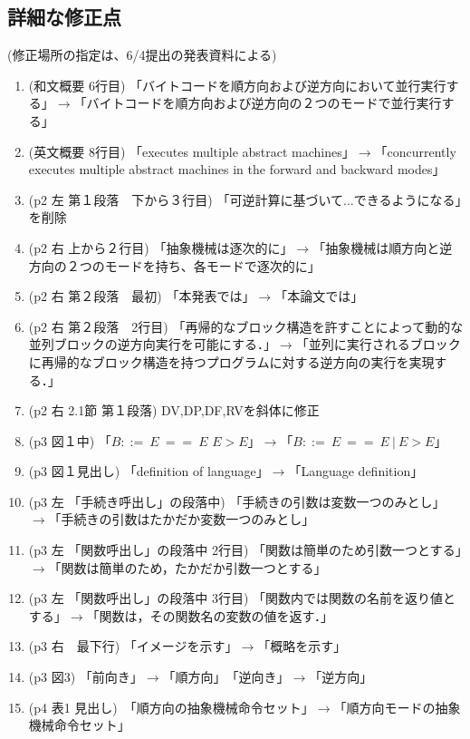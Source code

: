 \documentclass[a4j]{jarticle}
\begin{document}
\subsection*{詳細な修正点}

(修正場所の指定は、6/4提出の発表資料による)

\begin{enumerate}
\item (和文概要 6行目) 「バイトコードを順方向および逆方向において並行実行する」$\rightarrow$「バイトコードを順方向および逆方向の２つのモードで並行実行する」
\item (英文概要 8行目) 「executes multiple abstract machines」$\rightarrow$「concurrently executes multiple abstract machines in the forward and backward modes」
\item (p2 左 第１段落　下から３行目) 「可逆計算に基づいて...できるようになる」を削除
\item (p2 右 上から２行目) 「抽象機械は逐次的に」$\rightarrow$「抽象機械は順方向と逆方向の２つのモードを持ち、各モードで逐次的に」
\item (p2 右 第２段落　最初) 「本発表では」$\rightarrow$「本論文では」
\item (p2 右 第２段落　2行目) 「再帰的なブロック構造を許すことによって動的な並列ブロックの逆方向実行を可能にする．」$\rightarrow$「並列に実行されるブロックに再帰的なブロック構造を持つプログラムに対する逆方向の実行を実現する．」
\item (p2 右 2.1節 第１段落) DV,DP,DF,RVを斜体に修正
\item (p3 図１中) 「$B::=\ E\ ==\ E$ $E>E$」$\rightarrow$「$B::=\ E\ ==\ E\ |\ E>E$」
\item (p3 図１見出し) 「definition of language」$\rightarrow$「Language definition」
\item (p3 左 「手続き呼出し」の段落中) 「手続きの引数は変数一つのみとし」$\rightarrow$「手続きの引数はたかだか変数一つのみとし」
\item (p3 左 「関数呼出し」の段落中 2行目) 「関数は簡単のため引数一つとする」$\rightarrow$「関数は簡単のため，たかだか引数一つとする」
\item (p3 左 「関数呼出し」の段落中 3行目) 「関数内では関数の名前を返り値とする」$\rightarrow$「関数は，その関数名の変数の値を返す．」
\item (p3 右　最下行) 「イメージを示す」$\rightarrow$「概略を示す」
\item (p3 図3) 「前向き」$\rightarrow$「順方向」　「逆向き」$\rightarrow$「逆方向」
\item (p4 表1 見出し)　「順方向の抽象機械命令セット」$\rightarrow$「順方向モードの抽象機械命令セット」 

\end{enumerate}
\end{document}
